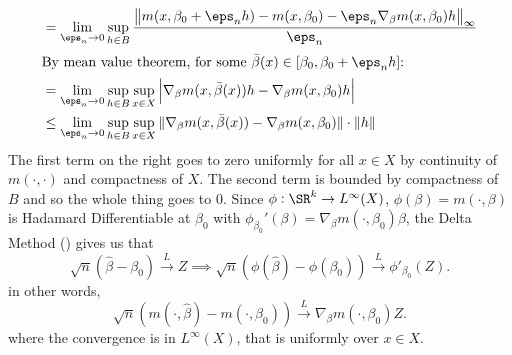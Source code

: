 \begin{example}
\begin{align*}
		&= \lim_{\eps_n\to 0}\sup_{h\in B}\frac{\left\|m(x,\beta_0+\eps_nh)-m(x,\beta_0)-\eps_n\nabla_\beta m(x,\beta_0)h\right\|_\infty}{\eps_n}\\
		\intertext{By mean value theorem, for some \(\bar{\beta}(x)\in [\beta_0, \beta_0+ \eps_nh]\):}
		&= \lim_{\eps_n\to0}\sup_{h\in B}\sup_{x\in X}\left|\nabla_\beta m(x,\bar\beta(x))h-\nabla_\beta m(x,\beta_0)h\right|\\
		&\leq \lim_{\eps_n\to 0}\sup_{h\in B}\sup_{x\in X}\|\nabla_\beta m(x,\bar\beta(x))-\nabla_\beta m(x,\beta_0)\|\cdot\|h\|
	\end{align*}
	The first term on the right goes to zero uniformly for all \(x\in X\) by continuity of \(m(\cdot,\cdot)\) and compactness of  \(X\). The second term is bounded by compactness of  \(B\) and so the whole thing goes to 0. Since \(\phi:\SR^k\to L^\infty(X)\), \(\phi(\beta)=m(\cdot,\beta)\) is Hadamard Differentiable at \(\beta_0\) with \(\phi_{\beta_0}'(\beta) = \nabla_\beta m(\cdot,\beta_0)\beta\), the Delta Method () gives us that
	\[
		\sqrt{n}\left(\widehat\beta-\beta_0\right)\overset{L}{\to} Z \implies \sqrt{n}(\phi(\widehat\beta)-\phi(\beta_0))\overset{L}{\to} \phi'_{\beta_0}(Z)
	.\] 
	in other words,
	 \[
		 \sqrt{n}\left(m(\cdot, \widehat\beta)-m(\cdot,\beta_0)\right)\overset{L}{\to}\nabla_\beta m(\cdot,\beta_0)Z
	.\] 
	where the convergence is in \(L^\infty(X)\), that is uniformly over  \(x\in X\).
\end{example}

